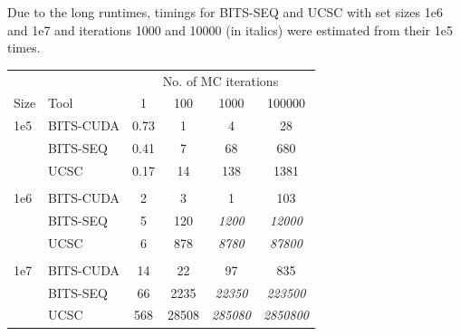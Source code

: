 \documentclass{bioinfo}
\begin{document}
Due to the long runtimes, timings for BITS-SEQ and UCSC
with set sizes 1e6 and 1e7 and iterations 1000 and 10000 (in italics) were
estimated from their 1e5 times.

\begin{center}
	\begin{tabular}{l l c c c c}
	\multicolumn{2}{c}{} & \multicolumn{4}{c}{No. of MC iterations} \\
	\cline{3-6}
	Size & Tool & 1 & 100 & 1000 & 100000 \\
	\hline
	\hline
	1e5 & BITS-CUDA & 0.73 & 1  & 4   & 28 \\
		& BITS-SEQ  & 0.41 & 7  & 68  & 680 \\
		& UCSC      & 0.17 & 14 & 138 & 1381 \\
	\\
	1e6 & BITS-CUDA & 2 & 3    & 1       & 103 \\
		& BITS-SEQ  & 5 & 120  & \emph{1200} & \emph{12000} \\
		& UCSC      & 6 & 878  & \emph{8780} & \emph{87800} \\
	\\
	1e7 & BITS-CUDA & 14  & 22    & 97            & 835 \\
		& BITS-SEQ  & 66  & 2235  & \emph{22350}  & \emph{223500} \\
		& UCSC      & 568 & 28508 & \emph{285080} & \emph{2850800} \\
	
	\hline
	\end{tabular}
\end{center}
\label{table:avge}

		

\end{document}
